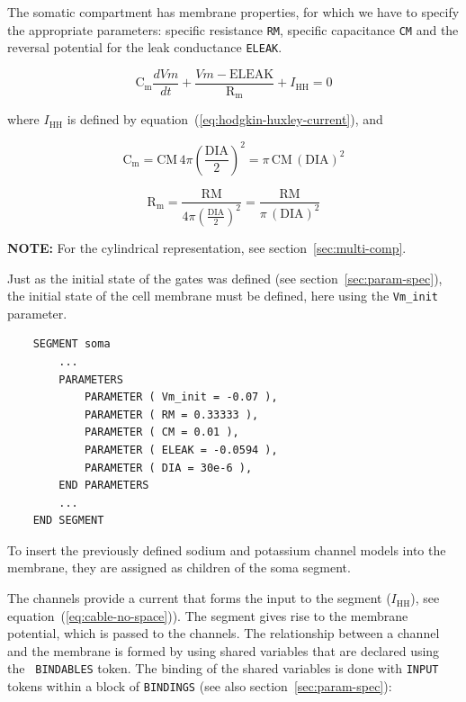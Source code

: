 \documentclass[12pt]{article}
\begin{document}
The somatic compartment has membrane properties, for which we have to
specify the appropriate parameters: specific resistance {\tt RM},
specific capacitance {\tt CM} and the reversal potential for the leak
conductance {\tt ELEAK}.


\begin{equation}
  \label{eq:cable-no-space}
  \mathrm{C_m} \frac{dVm}{dt} + \frac{Vm - \mathrm{ELEAK}}{\mathrm{R_m}} + I_{\mathrm{HH}} = 0
\end{equation}

where $I_{\mathrm{HH}}$ is defined by
equation~(\ref{eq:hodgkin-huxley-current}), and

\begin{equation}
  \label{eq:cable-no-space-cm}
  \mathrm{C_m} = \mathrm{CM} \, 4 \pi \left( \frac{\mathrm{DIA}}{2} \right) ^2 = \pi \, \mathrm{CM} \, (\mathrm{DIA}) ^2
\end{equation}

\begin{equation}
  \label{eq:cable-no-space-rm}
  \mathrm{R_m} = \frac{\mathrm{RM}}{4 \pi \left( \frac{\mathrm{DIA}}{2} \right) ^2} = \frac{\mathrm{RM}}{\pi \, (\mathrm{DIA}) ^2}
\end{equation}

{\bf NOTE:} For the cylindrical representation, see section~\ref{sec:multi-comp}.

Just as the initial state of the gates was defined (see
section~\ref{sec:param-spec}), the initial state of the cell membrane
must be defined, here using the {\tt Vm\_init} parameter.

\begin{verbatim}
    SEGMENT soma
        ...
        PARAMETERS
            PARAMETER ( Vm_init = -0.07 ),
            PARAMETER ( RM = 0.33333 ),
            PARAMETER ( CM = 0.01 ),
            PARAMETER ( ELEAK = -0.0594 ),
            PARAMETER ( DIA = 30e-6 ),
        END PARAMETERS
        ...
    END SEGMENT
\end{verbatim}

To insert the previously defined sodium and potassium channel models
into the membrane, they are assigned as children of the soma segment.

The channels provide a current that forms the input to the segment
($I_{\mathrm{HH}}$), see equation~(\ref{eq:cable-no-space})).  The
segment gives rise to the membrane potential, which is passed to the
channels.  The relationship between a channel and the membrane is
formed by using shared variables that are declared using the {\tt
  BINDABLES} token.  The binding of the shared variables is done with
{\tt INPUT} tokens within a block of {\tt BINDINGS} (see also
section~\ref{sec:param-spec}):
\end{document}
